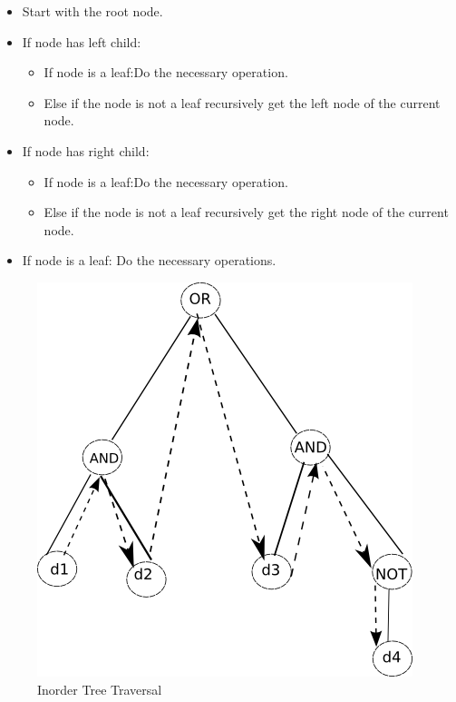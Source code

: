 \documentclass[10pt, a4paper, titlepage]{article}
\begin{document}
\begin{itemize}
\item Start with the root node.

\item If node has left child:

\begin{itemize}
\item If node is a leaf:Do the necessary operation.
\item Else if the node is not a leaf recursively get the left node of the current node.
\end{itemize}

\item If node has right child:

\begin{itemize}
\item If node is a leaf:Do the necessary operation.
\item Else if the node is not a leaf recursively get the right node of the current node.
\end{itemize}

\item If node is a leaf: Do the necessary operations.
\end{itemize}

\begin{figure}[h]
\centering
\includegraphics[scale=0.6]{images/inorder.png}
\caption{Inorder Tree Traversal}
\label{fig:traversal}
\end{figure}
\end{document}
